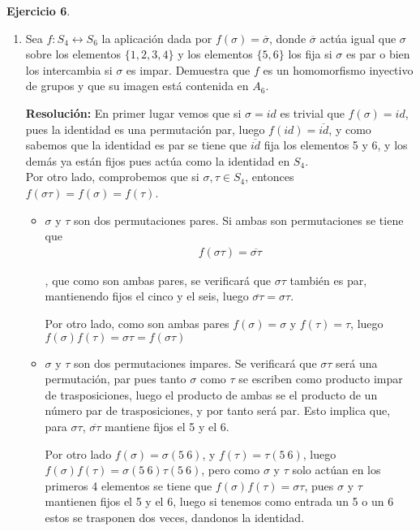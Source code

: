 \documentclass{article}
\begin{document}
\textbf{Ejercicio 6}.
\begin{enumerate}
\item Sea $f:S_4\longleftrightarrow S_6$ la aplicación dada por $f(\sigma)=\overline{\sigma}$, donde $\overline{\sigma}$ actúa igual que $\sigma$ sobre los elementos $\{1,2,3,4\}$ y los elementos $\{5,6\}$ los fija si $\sigma$ es par o bien los intercambia si $\sigma$ es impar. Demuestra que $f$ es un homomorfismo inyectivo de grupos y que su imagen está contenida en $A_6$.

\textbf{Resolución:} En primer lugar vemos que si $\sigma=id$ es trivial que $f(\sigma)=id$, pues la identidad es una permutación par, luego $f(id)=\overline{id}$, y como sabemos que la identidad es par se tiene que $\overline{id}$ fija los elementos 5 y 6, y los demás ya están fijos pues actúa como la identidad en $S_4$. \\

Por otro lado, comprobemos que si $\sigma,\tau\in S_4$, entonces $f(\sigma\tau)=f(\sigma)=f(\tau)$. 
\begin{itemize}
\item $\sigma$ y $\tau$ son dos permutaciones pares. Si ambas son permutaciones se tiene que 
\begin{gather*}
f(\sigma\tau)=\overline{\sigma\tau}
\end{gather*}

, que como son ambas pares, se verificará que $\sigma\tau$ también es par, mantienendo fijos el cinco y el seis, luego $\overline{\sigma\tau}=\sigma\tau$.

Por otro lado, como son ambas pares $f(\sigma)=\sigma$ y $f(\tau)=\tau$, luego $f(\sigma)f(\tau)=\sigma\tau=f(\sigma\tau)$

\item $\sigma$ y $\tau$ son dos permutaciones impares. Se verificará que $\sigma\tau$ será una permutación, par pues tanto $\sigma$ como $\tau$ se escriben como producto impar de trasposiciones, luego el producto de ambas se el producto de un número par de trasposiciones, y por tanto será par. Esto implica que, para $\sigma\tau$, $\overline{\sigma\tau}$ mantiene fijos el 5 y el 6.

Por otro lado $f(\sigma)=\sigma(5\:6)$, y $f(\tau)=\tau(5\:6)$, luego $f(\sigma)f(\tau)=\sigma(5\:6)\tau(5\:6)$, pero como $\sigma$ y $\tau$ solo actúan en los primeros 4 elementos se tiene que $f(\sigma)f(\tau)=\sigma\tau$, pues $\sigma$ y $\tau$ mantienen fijos el 5 y el 6, luego si tenemos como entrada un 5 o un 6 estos se trasponen dos veces, dandonos la identidad.


\end{itemize}
\end{enumerate}
\end{document}
